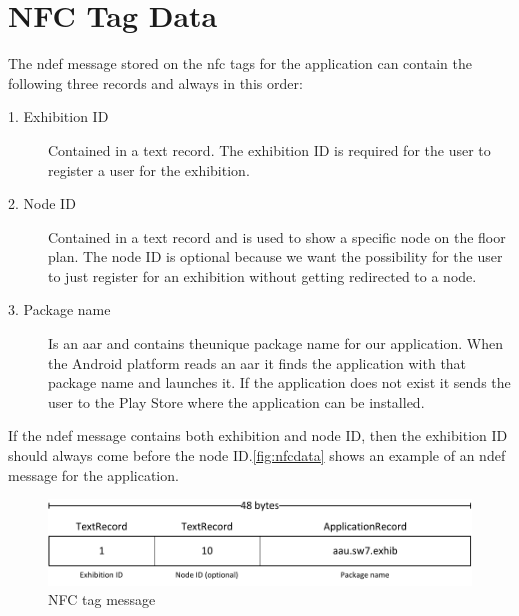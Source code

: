 \section{NFC Tag Data}
\label{sec:nfcdata}

The \ac{ndef} message stored on the \ac{nfc} tags for the application can contain the following three records and always in this order:

\begin{description}
\item[1. Exhibition ID] Contained in a text record. The exhibition ID is required for the user to register a user for the exhibition.
\item[2. Node ID] Contained in a text record and is used to show a specific node on the floor plan. The node ID is optional because we want the possibility for the user to just register for an exhibition without getting redirected to a node.
\item[3. Package name] Is an \ac{aar} and contains the\linebreak unique package name for our application. When the Android platform reads an \ac{aar} it finds the application with that package name and launches it. If the application does not exist it sends the user to the Play Store where the application can be installed.
\end{description}
If the \ac{ndef} message contains both exhibition and node ID, then the exhibition ID should always come before the node ID.\autoref{fig:nfcdata} shows an example of an \ac{ndef} message for the application.

\begin{figure}[H]
\centering
\includegraphics[width=0.97\columnwidth]{img/nfctag.pdf}
\caption{NFC tag message}
\label{fig:nfcdata}
\end{figure}
